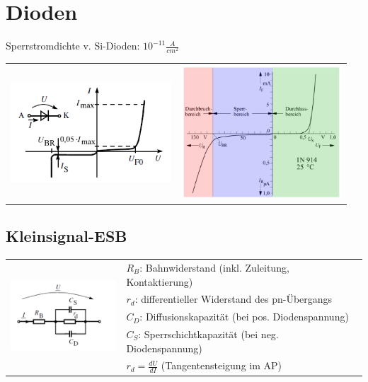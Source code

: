 \section{Dioden}
	Sperrstromdichte v. Si-Dioden: $10^{-11} \frac{A}{cm^2}$ \\
	\begin{tabular}{l l}
			\includegraphics[width=6cm]{./images/Diode-Kennlinie.png}
		&	\includegraphics[width=6cm]{./images/Diode-Kennlinie-2.png}
	\end{tabular}
	
	\subsection{Kleinsignal-ESB}
		\begin{tabular}{l l}
			\multirow{5}{*}{\includegraphics[width=4cm]{./images/Diode-KS-ESB.png}}
			& $R_B$: Bahnwiderstand (inkl. Zuleitung, Kontaktierung) \\
			& $r_d$: differentieller Widerstand des pn-Übergangs \\
			& $C_D$: Diffusionskapazität (bei pos. Diodenspannung) \\
			& $C_S$: Sperrschichtkapazität (bei neg. Diodenspannung)\\
			& $r_d=\frac{dU}{dI}$ (Tangentensteigung im AP) \\
		\end{tabular}
	
